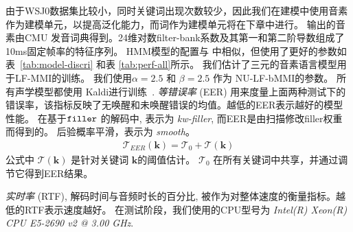 由于WSJ0数据集比较小，同时关键词出现次数较少，因此我们在建模中使用音素作为建模单元，以提高泛化能力，而词作为建模单元将在下章中进行。
输出的音素由CMU 发音词典得到。24维对数filter-bank系数及其第一和第二阶导数组成了10ms固定帧率的特征序列。
HMM模型的配置与 \cite{povey2016purely}中相似，但使用了更好的参数如表~\ref{tab:model-discri} 和表 \ref{tab:perf-all}所示。 我们估计了三元的音素语言模型用于LF-MMI的训练。
我们使用$\alpha=2.5$ 和 $\beta=2.5$ 作为 NU-LF-bMMI的参数。
所有声学模型都使用 Kaldi进行训练~\cite{povey2011kaldi}.
 {\em 等错误率} (EER) 用来度量上面两种测试下的错误率，该指标反映了无唤醒和未唤醒错误的均值。越低的EER表示越好的模型性能。
在基于$\tt filler$ 的解码中, 表示为 {\em{kw-filler}}, 而EER是由扫描修改filler权重而得到的。
后验概率平滑，表示为 {\em{smooth}}。
\begin{equation}
\label{equ:eer-thres}
\begin{split}
\mathcal T_{EER}(\mathbf{k})=\mathcal T_0+\mathcal T(\mathbf{k})
\end{split}
\end{equation}
公式中 $\mathcal T(\mathbf{k})$ 是针对关键词 $\mathbf{k}$的阈值估计。 $\mathcal T_0$ 在所有关键词中共享，并通过调节它得到EER结果。

{\em 实时率} (RTF), 解码时间与音频时长的百分比, 被作为对整体速度的衡量指标。越低的RTF表示速度越好。
在测试阶段，我们使用的CPU型号为
{\em{Intel(R) Xeon(R) CPU E5-2690 v2 @ 3.00 GHz}}. 

